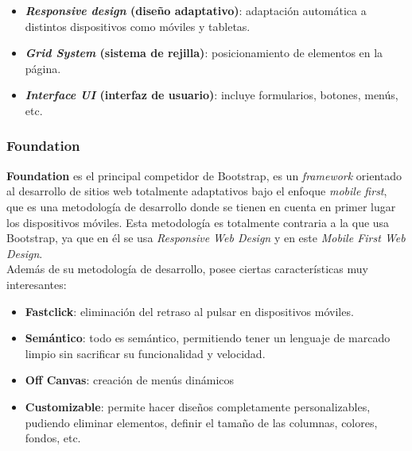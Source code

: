         
        \begin{itemize}
            \item \textbf{\textit{Responsive design} (diseño adaptativo)}: adaptación
            automática a distintos dispositivos como móviles y tabletas.
            \item \textbf{\textit{Grid System} (sistema de rejilla)}: posicionamiento de
            elementos en la página.
            \item \textbf{\textit{Interface UI} (interfaz de usuario)}: incluye formularios,
            botones, menús, etc.
        \end{itemize}
        
        \subsubsection{Foundation}
        \textbf{Foundation} \cite{foundation} es el principal competidor de Bootstrap, es
        un \textit{framework} orientado al desarrollo de sitios web totalmente adaptativos
        bajo el enfoque \textit{mobile first}, que es una metodología de desarrollo donde
        se tienen en cuenta en primer lugar los dispositivos móviles. Esta metodología es
        totalmente contraria a la que usa Bootstrap, ya que en él se usa \textit{Responsive
        Web Design} y en este \textit{Mobile First Web Design}.\\
        
        Además de su metodología de desarrollo, posee ciertas características muy interesantes:
        
        \begin{itemize}
            \item \textbf{Fastclick}: eliminación del retraso al pulsar en dispositivos
            móviles.
            \item \textbf{Semántico}: todo es semántico, permitiendo tener un lenguaje de
            marcado limpio sin sacrificar su funcionalidad y velocidad.
            \item \textbf{Off Canvas}: creación de menús dinámicos
            \item \textbf{Customizable}: permite hacer diseños completamente personalizables,
            pudiendo eliminar elementos, definir el tamaño de las columnas, colores,
            fondos, etc.
        \end{itemize}

